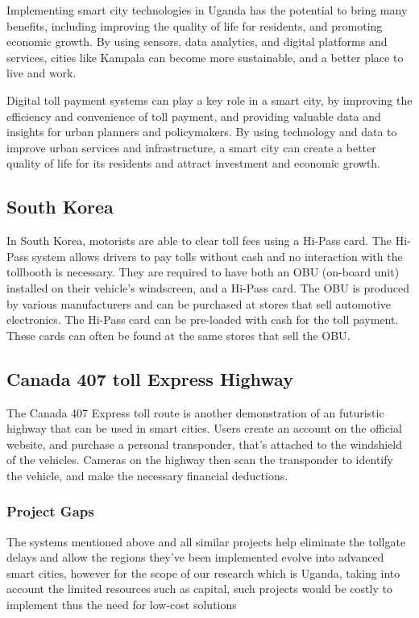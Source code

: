 Implementing smart city technologies in Uganda has the potential to bring many benefits, including improving the quality of life for residents, and promoting economic growth. By using sensors, data analytics, and digital platforms and services, cities like Kampala can become more sustainable, and a better place to live and work.

Digital toll payment systems can play a key role in a smart city, by improving the efficiency and convenience of toll payment, and providing valuable data and insights for urban planners and policymakers. By using technology and data to improve urban services and infrastructure, a smart city can create a better quality of life for its residents and attract investment and economic growth.

\subsection{South Korea}
In South Korea, motorists are able to clear toll fees using a Hi-Pass card. The Hi-Pass system allows drivers to pay tolls without cash and no interaction with the tollbooth is necessary. They are required to have both an OBU (on-board unit) installed on their vehicle's windscreen, and a Hi-Pass card. The OBU is produced by various manufacturers and can be purchased at stores that sell automotive electronics. The Hi-Pass card can be pre-loaded with cash for the toll payment. These cards can often be found at the same stores that sell the OBU\cite{chang_evaluations_2002}.

\subsection{Canada 407 toll Express Highway}
The Canada 407 Express toll route is another demonstration of an futuristic highway that can be used in smart cities. Users create an account on the official website, and purchase a personal transponder, that's attached to the windshield of the vehicles. Cameras on the highway then scan the transponder to identify the vehicle, and make the necessary financial deductions\cite{feldstein_torontos_2015}.

\subsubsection{Project Gaps}
The systems mentioned above and all similar projects help eliminate the tollgate delays and allow the regions they've been implemented evolve into advanced smart cities, however for the scope of our research which is Uganda, taking into account the limited resources such as capital, such projects would be costly to implement thus the need for low-cost solutions


